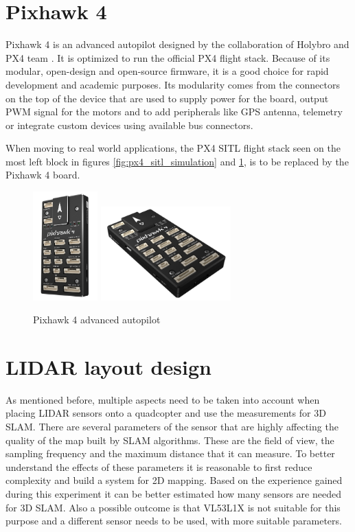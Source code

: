 \section{Pixhawk 4}
Pixhawk 4 is an advanced autopilot designed by the collaboration of Holybro and PX4 team \cite{Pixhawk4Website}. 
It is optimized to run the official PX4 flight stack. Because of its modular, open-design and open-source 
firmware, it is a good choice for rapid development and academic purposes. Its modularity comes from the 
connectors on the top of the device that are used to supply power for the board, output PWM signal for 
the motors and to add peripherals like GPS antenna, telemetry or integrate custom devices using available
bus connectors. 

When moving to real world applications, the PX4 SITL flight stack seen on the most left block in figures
\ref{fig:px4_sitl_simulation} and \ref{fig:px4_sitl_ros_wrapper}, is to be replaced by the Pixhawk 4 board.

\begin{figure}[h]
    \centering
    \includegraphics[width=25mm, keepaspectratio]{figures/pixhawk4.jpg}\hspace{0cm}
    \includegraphics[width=50mm, keepaspectratio]{figures/pixhawk4_2.jpg}
    \caption{Pixhawk 4 advanced autopilot}
    \label{fig:px4_sitl_ros_wrapper}
\end{figure}

\section{LIDAR layout design}
As mentioned before, multiple aspects need to be taken into account when placing LIDAR sensors onto a
quadcopter and use the measurements for 3D SLAM. There are several parameters of the sensor that are 
highly affecting the quality of the map built by SLAM algorithms. These are the field of view, the 
sampling frequency and the maximum distance that it can measure. To better understand the effects of
these parameters it is reasonable to first reduce complexity and build a system for 2D mapping. Based on 
the experience gained during this experiment it can be better estimated how many sensors are needed for
3D SLAM. Also a possible outcome is that VL53L1X is not suitable for this purpose and a different
sensor needs to be used, with more suitable parameters.

